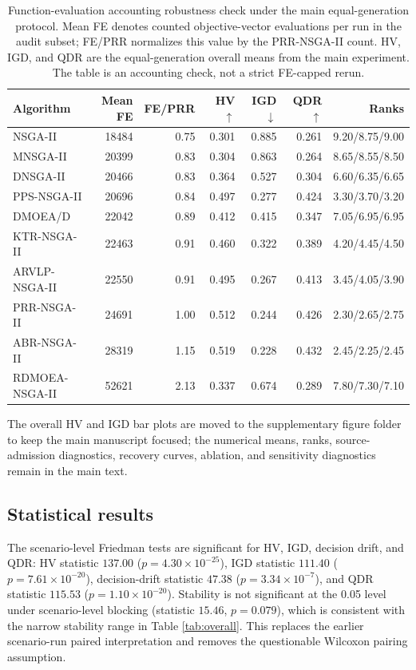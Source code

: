 \documentclass[1p,times]{elsarticle}
\begin{document}
\begin{table}[t]
\centering
\caption{Function-evaluation accounting robustness check under the main equal-generation protocol. Mean FE denotes counted objective-vector evaluations per run in the audit subset; FE/PRR normalizes this value by the PRR-NSGA-II count. HV, IGD, and QDR are the equal-generation overall means from the main experiment. The table is an accounting check, not a strict FE-capped rerun.}
\label{tab:fe-robustness}
\scriptsize
\setlength{\tabcolsep}{3pt}
\begin{tabular}{lrrrrrr}
\toprule
Algorithm & Mean FE & FE/PRR & HV $\uparrow$ & IGD $\downarrow$ & QDR $\uparrow$ & Ranks \\
\midrule
NSGA-II & 18484 & 0.75 & 0.301 & 0.885 & 0.261 & 9.20/8.75/9.00 \\
MNSGA-II & 20399 & 0.83 & 0.304 & 0.863 & 0.264 & 8.65/8.55/8.50 \\
DNSGA-II & 20466 & 0.83 & 0.364 & 0.527 & 0.304 & 6.60/6.35/6.65 \\
PPS-NSGA-II & 20696 & 0.84 & 0.497 & 0.277 & 0.424 & 3.30/3.70/3.20 \\
DMOEA/D & 22042 & 0.89 & 0.412 & 0.415 & 0.347 & 7.05/6.95/6.95 \\
KTR-NSGA-II & 22463 & 0.91 & 0.460 & 0.322 & 0.389 & 4.20/4.45/4.50 \\
ARVLP-NSGA-II & 22550 & 0.91 & 0.495 & 0.267 & 0.413 & 3.45/4.05/3.90 \\
PRR-NSGA-II & 24691 & 1.00 & 0.512 & 0.244 & 0.426 & 2.30/2.65/2.75 \\
ABR-NSGA-II & 28319 & 1.15 & 0.519 & 0.228 & 0.432 & 2.45/2.25/2.45 \\
RDMOEA-NSGA-II & 52621 & 2.13 & 0.337 & 0.674 & 0.289 & 7.80/7.30/7.10 \\
\bottomrule
\end{tabular}
\end{table}



The overall HV and IGD bar plots are moved to the supplementary figure folder to keep the main manuscript focused; the numerical means, ranks, source-admission diagnostics, recovery curves, ablation, and sensitivity diagnostics remain in the main text.

\subsection{Statistical results}
The scenario-level Friedman tests are significant for HV, IGD, decision drift, and QDR: HV statistic $137.00$ ($p=4.30\times10^{-25}$), IGD statistic $111.40$ ($p=7.61\times10^{-20}$), decision-drift statistic $47.38$ ($p=3.34\times10^{-7}$), and QDR statistic $115.53$ ($p=1.10\times10^{-20}$). Stability is not significant at the 0.05 level under scenario-level blocking (statistic $15.46$, $p=0.079$), which is consistent with the narrow stability range in Table \ref{tab:overall}. This replaces the earlier scenario-run paired interpretation and removes the questionable Wilcoxon pairing assumption.
\end{document}
